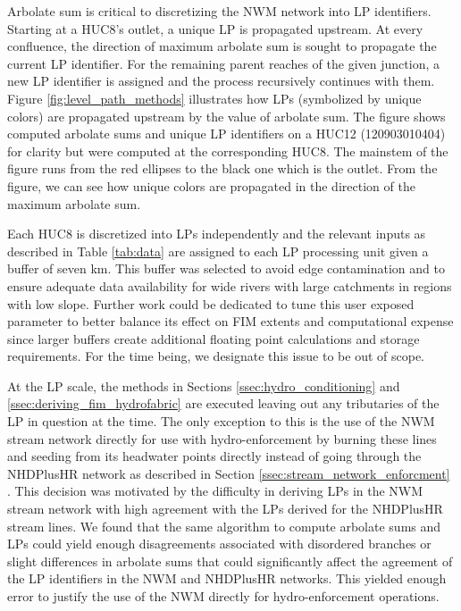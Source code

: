 \documentclass[draft]{dependencies/agujournal2019}
\begin{document}
Arbolate sum is critical to discretizing the NWM network into LP identifiers.
Starting at a HUC8's outlet, a unique LP is propagated upstream. 
At every confluence, the direction of maximum arbolate sum is sought to propagate the current LP identifier.
For the remaining parent reaches of the given junction, a new LP identifier is assigned and the process recursively continues with them.
Figure \ref{fig:level_path_methods} illustrates how LPs (symbolized by unique colors) are propagated upstream by the value of arbolate sum.
The figure shows computed arbolate sums and unique LP identifiers on a HUC12 (120903010404) for clarity but were computed at the corresponding HUC8.
The mainstem of the figure runs from the red ellipses to the black one which is the outlet.
From the figure, we can see how unique colors are propagated in the direction of the maximum arbolate sum.

Each HUC8 is discretized into LPs independently and the relevant inputs as described in Table \ref{tab:data} are assigned to each LP processing unit given a buffer of seven km.
This buffer was selected to avoid edge contamination \cite{lindsay2013measuring} and to ensure adequate data availability for wide rivers with large catchments in regions with low slope.
Further work could be dedicated to tune this user exposed parameter to better balance its effect on FIM extents and computational expense since larger buffers create additional floating point calculations and storage requirements.
For the time being, we designate this issue to be out of scope.

At the LP scale, the methods in Sections \ref{ssec:hydro_conditioning} and \ref{ssec:deriving_fim_hydrofabric} are executed leaving out any tributaries of the LP in question at the time.
The only exception to this is the use of the NWM stream network directly for use with hydro-enforcement by burning these lines and seeding from its headwater points directly instead of going through the NHDPlusHR network as described in Section \ref{ssec:stream_network_enforcment} .
This decision was motivated by the difficulty in deriving LPs in the NWM stream network with high agreement with the LPs derived for the NHDPlusHR stream lines.
We found that the same algorithm to compute arbolate sums and LPs could yield enough disagreements associated with disordered branches or slight differences in arbolate sums that could significantly affect the agreement of the LP identifiers in the NWM and NHDPlusHR networks.
This yielded enough error to justify the use of the NWM directly for hydro-enforcement operations.
\end{document}
